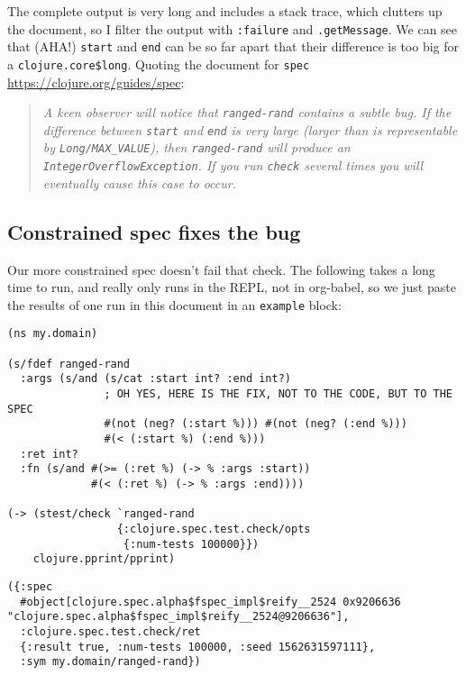 \documentclass[10pt,oneside,x11names]{article}
\begin{document}
The complete output is very long and includes a stack trace, which clutters up
the document, so I filter the output with \texttt{:failure} and \texttt{.getMessage}. We can
see that (AHA!) \texttt{start} and \texttt{end} can be so far apart that their difference is
too big for a \texttt{clojure.core\$long}. Quoting the document for \texttt{spec}
\url{https://clojure.org/guides/spec}:

\begin{quote}
\emph{A keen observer will notice that \texttt{ranged-rand} contains a subtle bug. If the difference between \texttt{start} and \texttt{end} is very large (larger than is representable by \texttt{Long/MAX\_VALUE}), then \texttt{ranged-rand} will produce an \texttt{IntegerOverflowException}. If you run \texttt{check} several times you will eventually cause this case to occur.}
\end{quote}

\subsection{Constrained spec fixes the bug}
\label{sec:org4135c30}

Our more constrained spec doesn't fail that check. The following takes a long
time to run, and really only runs in the REPL, not in org-babel, so we just
paste the results of one run in this document in an \texttt{example} block:

\begin{verbatim}
(ns my.domain)

(s/fdef ranged-rand
  :args (s/and (s/cat :start int? :end int?)
               ; OH YES, HERE IS THE FIX, NOT TO THE CODE, BUT TO THE SPEC
               #(not (neg? (:start %))) #(not (neg? (:end %)))
               #(< (:start %) (:end %)))
  :ret int?
  :fn (s/and #(>= (:ret %) (-> % :args :start))
             #(< (:ret %) (-> % :args :end))))

(-> (stest/check `ranged-rand
                 {:clojure.spec.test.check/opts
                  {:num-tests 100000}})
    clojure.pprint/pprint)
\end{verbatim}

\begin{verbatim}
({:spec
  #object[clojure.spec.alpha$fspec_impl$reify__2524 0x9206636 "clojure.spec.alpha$fspec_impl$reify__2524@9206636"],
  :clojure.spec.test.check/ret
  {:result true, :num-tests 100000, :seed 1562631597111},
  :sym my.domain/ranged-rand})
\end{verbatim}
\end{document}
